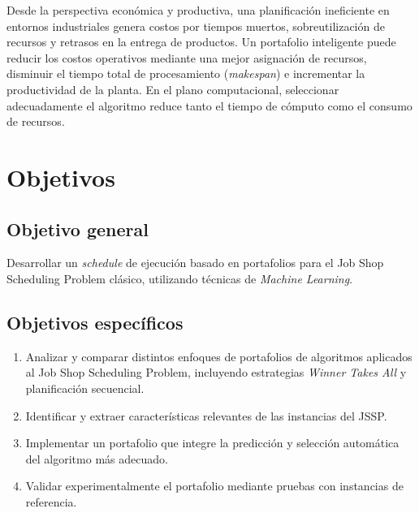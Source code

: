 Desde la perspectiva económica y productiva, una planificación ineficiente en
entornos industriales genera costos por tiempos muertos, sobreutilización de
recursos y retrasos en la entrega de productos. Un portafolio inteligente puede
reducir los costos operativos mediante una mejor asignación de recursos,
disminuir el tiempo total de procesamiento (\textit{makespan}) e incrementar la
productividad de la planta. En el plano computacional, seleccionar
adecuadamente el algoritmo reduce tanto el tiempo de cómputo como el consumo de
recursos.

\section{Objetivos}
\label{sec:objetivos}

\subsection{Objetivo general}

Desarrollar un \textit{schedule} de ejecución basado en portafolios para el Job
Shop Scheduling Problem clásico, utilizando técnicas de \textit{Machine
Learning}.

\subsection{Objetivos específicos}

\begin{enumerate}[label=\arabic*., leftmargin=1.27cm, itemsep=0.3em]
  \item Analizar y comparar distintos enfoques de portafolios de algoritmos
    aplicados al Job Shop Scheduling Problem, incluyendo estrategias
    \textit{Winner Takes All} y planificación secuencial.
  \item Identificar y extraer características relevantes de las instancias del
    JSSP.
  \item Implementar un portafolio que integre la predicción y selección
    automática del algoritmo más adecuado.
  \item Validar experimentalmente el portafolio mediante pruebas con instancias
    de referencia.
\end{enumerate}

